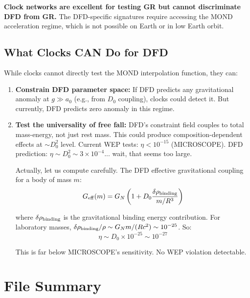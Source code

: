 \documentclass[11pt,a4paper]{article}
\begin{document}
\textbf{Clock networks are excellent for testing GR but cannot discriminate DFD from GR.} The DFD-specific signatures require accessing the MOND acceleration regime, which is not possible on Earth or in low Earth orbit.

\subsection{What Clocks CAN Do for DFD}

While clocks cannot directly test the MOND interpolation function, they can:

\begin{enumerate}
\item \textbf{Constrain DFD parameter space:} If DFD predicts any gravitational anomaly at $g \gg a_0$ (e.g., from $D_0$ coupling), clocks could detect it. But currently, DFD predicts zero anomaly in this regime.

\item \textbf{Test the universality of free fall:} DFD's constraint field couples to total mass-energy, not just rest mass. This could produce composition-dependent effects at $\sim D_0^2$ level. Current WEP tests: $\eta < 10^{-15}$ (MICROSCOPE). DFD prediction: $\eta \sim D_0^2 \sim 3\times10^{-4}$... wait, that seems too large.

Actually, let us compute carefully. The DFD effective gravitational coupling for a body of mass $m$:
\begin{equation}
G_{\rm eff}(m) = G_N\left(1 + D_0\frac{\delta\rho_{\rm binding}}{m/R^3}\right)
\end{equation}

where $\delta\rho_{\rm binding}$ is the gravitational binding energy contribution. For laboratory masses, $\delta\rho_{\rm binding}/\rho \sim G_N m/(Rc^2) \sim 10^{-25}$. So:
\begin{equation}
\eta \sim D_0 \times 10^{-25} \sim 10^{-27}
\end{equation}

This is far below MICROSCOPE's sensitivity. No WEP violation detectable.
\end{enumerate}

\section{File Summary}
\label{sec:summary}
\end{document}
